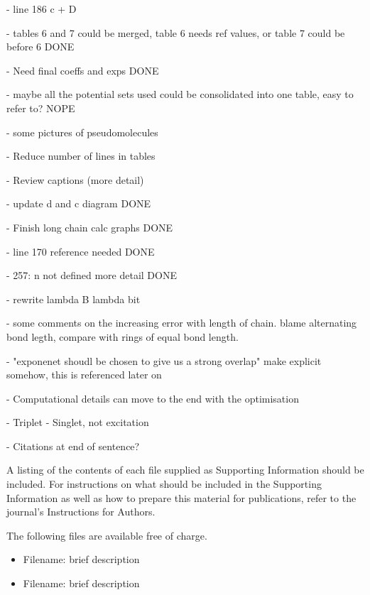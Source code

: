\documentclass[journal=jctcce,manuscript=article]{achemso}
\begin{document}
- line 186 c + D

- tables 6 and 7 could be merged, table 6 needs ref values, or table 7 could be before 6 DONE

- Need final coeffs and exps DONE

- maybe all the potential sets used could be consolidated into one table, easy to refer to? NOPE

- some pictures of pseudomolecules

- Reduce number of lines in tables

- Review captions (more detail)

- update d and c diagram DONE

- Finish long chain calc graphs DONE

- line 170 reference needed DONE

- 257: n not defined more detail DONE

- rewrite lambda B lambda bit

- some comments on the increasing error with length of chain. blame alternating bond legth, compare with rings of equal bond length. 

- "exponenet shoudl be chosen to give us a strong overlap" make explicit somehow, this is referenced later on

- Computational details can move to the end with the optimisation

- Triplet - Singlet, not excitation

- Citations at end of sentence? 


\begin{suppinfo}

A listing of the contents of each file supplied as Supporting Information
should be included. For instructions on what should be included in the
Supporting Information as well as how to prepare this material for
publications, refer to the journal's Instructions for Authors.

The following files are available free of charge.
\begin{itemize}
  \item Filename: brief description
  \item Filename: brief description
\end{itemize}

\end{suppinfo}


\end{document}
